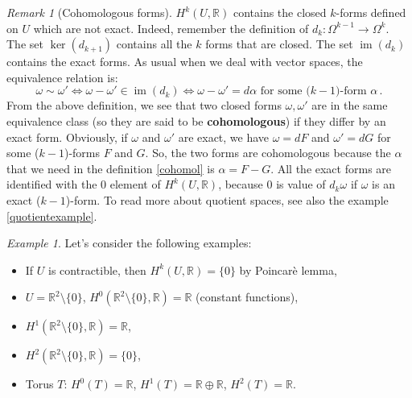 \documentclass[a4paper,11pt,titlepage, article, oneside]{memoir}
\numberwithin{equation}{section}
\theoremstyle{definition}
\theoremstyle{remark}
\newtheorem{remark}[theorem]{Remark}
\newtheorem{example}[theorem]{Example}
\DeclareMathOperator{\im}{im}
\newcommand{\rfield}{\mathbb{R}}
\begin{document}
\begin{remarkbox}\begin{remark}[Cohomologous forms]
  $H^k(U, \rfield)$ contains the closed $k$-forms defined on $U$ which are not exact. Indeed, remember the definition of $d_k\colon \Omega^{k-1} \rightarrow \Omega^k $. The set $\ker(d_{k+1})$ contains all the $k$ forms that are closed. The set $\im(d_k)$ contains the exact forms. As usual when we deal with vector spaces, the equivalence relation is:
  \begin{equation} \label{cohomol}
  \omega \sim \omega' \Leftrightarrow \omega - \omega' \in \im(d_k) \Leftrightarrow \omega - \omega' = d\alpha \text{ for some (} k-1 \text{)-form } \alpha \, .
  \end{equation} 
  From the above definition, we see that two closed forms $\omega, \omega'$ are in the same equivalence class (so they are said to be \textbf{cohomologous}) if they differ by an exact form.
  Obviously, if $\omega$ and $\omega'$ are exact, we have $\omega = dF$ and $\omega'=dG$ for some ($k-1$)-forms $F$ and $G$. So, the two forms are cohomologous because the $\alpha$ that we need in the definition \eqref{cohomol} is $\alpha = F - G$. All the exact forms are identified with the 0 element of $H^k(U, \rfield)$, because 0 is value of $d_k\omega$ if $\omega$ is an exact ($k-1$)-form.
  To read more about quotient spaces, see also the example \ref{quotientexample}.
\end{remark}\end{remarkbox}

\begin{tcolorbox}\begin{example}
  Let's consider the following examples:
  \begin{itemize}
    \item If $U$ is contractible, then $H^k(U, \rfield) = \{0\}$ by Poincarè lemma,
    \item $U=\rfield^2 \setminus \{0\}$, $H^0(\rfield^2 \setminus \{0\}, \rfield) = \rfield$ (constant functions),
    \item $H^1(\rfield^2 \setminus \{0\}, \rfield) = \rfield$,
    \item $H^2(\rfield^2 \setminus \{0\}, \rfield) = \{0\}$,
    \item Torus $T$: $H^0(T) = \rfield$,  $H^1(T) = \rfield \oplus \rfield$, $H^2(T) = \rfield$.
  \end{itemize}
\end{example}\end{tcolorbox}
\end{document}
